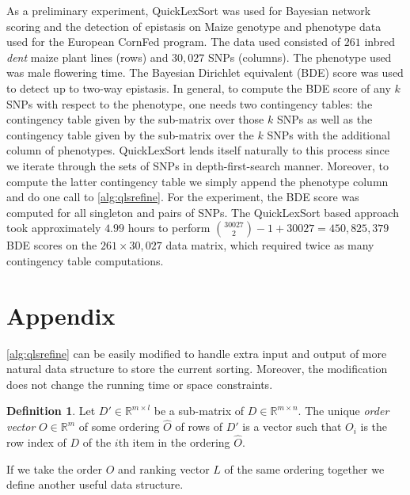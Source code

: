 \documentclass[a4paper,10pt,reqno]{amsart}
\newcommand\R{\mathbb R}
\theoremstyle{definition}
\newtheorem{definition}{Definition}
\begin{document}
As a preliminary experiment, QuickLexSort was used for Bayesian network scoring
and the detection of epistasis on Maize genotype and phenotype data
\cite{rincent2012maximizing} used for the European CornFed program. The data
used consisted of $261$ inbred \emph{dent} maize plant lines (rows) and
$30,027$ SNPs (columns). The phenotype used was male flowering time. The
Bayesian Dirichlet equivalent (BDE) \cite{heckerman1995learning} score was used
to detect up to two-way epistasis. In general, to compute the BDE score of any
$k$ SNPs with respect to the phenotype, one needs two contingency tables: the
contingency table given by the sub-matrix over those $k$ SNPs as well as the
contingency table given by the sub-matrix over the $k$ SNPs with the additional
column of phenotypes. QuickLexSort lends itself naturally to this process
since we iterate through the sets of SNPs in depth-first-search manner. Moreover,
to compute the latter contingency table we simply append the phenotype column
and do one call to \autoref{alg:qlsrefine}. For the experiment, the BDE score was computed
for all singleton and pairs of SNPs. The QuickLexSort based approach took
approximately $4.99$ hours to perform ${30027 \choose 2} - 1 + 30027 =
450,825,379$ BDE scores on the $261 \times 30,027$ data matrix, which required
twice as many contingency table computations. 










\section{Appendix}
\label{sec:appendix}
\autoref{alg:qlsrefine} can be easily modified to handle extra input and output 
of more natural data structure to store the current sorting. Moreover, the modification
does not change the running time or space constraints. 

\begin{definition}
Let $D' \in \R^{m \times l}$ be a sub-matrix of $D \in \R^{m \times n}$. 
The unique \emph{order vector} $O \in \R^m$ of some 
ordering $\widehat O$ of rows of $D'$ is a vector such that
$O_i$ is the row index of $D$ of the $i$th item in the ordering $\widehat O$.
\end{definition}

If we take the order $O$ and ranking vector $L$ of the same ordering together
we define another useful data structure.
\end{document}
